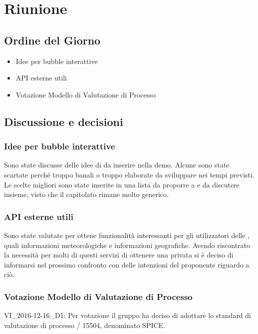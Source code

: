 \section{Riunione}
\subsection{Ordine del Giorno}
\begin{itemize}
	\item Idee per bubble interattive
	\item API esterne utili
	\item Votazione Modello di Valutazione di Processo
\end{itemize}

\subsection{Discussione e decisioni}
\subsubsection{Idee per bubble interattive}
Sono state discusse delle idee di  da inserire nella demo. Alcune sono state scartate perché troppo banali o troppo elaborate da sviluppare nei tempi previsti. Le scelte migliori sono state inserite in una lista da proporre a \Proponente{} e da discutere insieme, visto che il capitolato rimane molto generico.

\subsubsection{API esterne utili}
Sono state valutate  per ottene funzionalità interessanti per gli utilizzatori delle , quali informazioni meteorologiche e informazioni geografiche. Avendo riscontrato la necessità per molti di questi servizi di ottenere una  privata si è deciso di informarsi nel prossimo confronto con \Proponente{} delle intenzioni del proponente riguardo a ciò.  

\subsubsection{Votazione Modello di Valutazione di Processo}
VI\_2016-12-16\_D1: Per votazione il gruppo \GroupName{} ha deciso di adottare lo standard di valutazione di processo / 15504, denominato SPICE.

\clearpage
